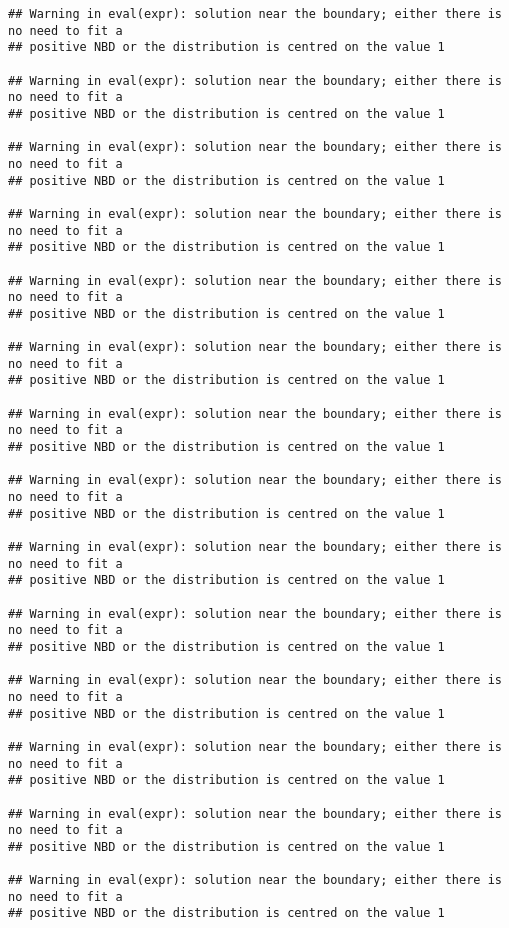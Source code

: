 \documentclass[
]{book}
\begin{document}
\begin{verbatim}
## Warning in eval(expr): solution near the boundary; either there is no need to fit a
## positive NBD or the distribution is centred on the value 1

## Warning in eval(expr): solution near the boundary; either there is no need to fit a
## positive NBD or the distribution is centred on the value 1

## Warning in eval(expr): solution near the boundary; either there is no need to fit a
## positive NBD or the distribution is centred on the value 1

## Warning in eval(expr): solution near the boundary; either there is no need to fit a
## positive NBD or the distribution is centred on the value 1

## Warning in eval(expr): solution near the boundary; either there is no need to fit a
## positive NBD or the distribution is centred on the value 1

## Warning in eval(expr): solution near the boundary; either there is no need to fit a
## positive NBD or the distribution is centred on the value 1

## Warning in eval(expr): solution near the boundary; either there is no need to fit a
## positive NBD or the distribution is centred on the value 1

## Warning in eval(expr): solution near the boundary; either there is no need to fit a
## positive NBD or the distribution is centred on the value 1

## Warning in eval(expr): solution near the boundary; either there is no need to fit a
## positive NBD or the distribution is centred on the value 1

## Warning in eval(expr): solution near the boundary; either there is no need to fit a
## positive NBD or the distribution is centred on the value 1

## Warning in eval(expr): solution near the boundary; either there is no need to fit a
## positive NBD or the distribution is centred on the value 1

## Warning in eval(expr): solution near the boundary; either there is no need to fit a
## positive NBD or the distribution is centred on the value 1

## Warning in eval(expr): solution near the boundary; either there is no need to fit a
## positive NBD or the distribution is centred on the value 1

## Warning in eval(expr): solution near the boundary; either there is no need to fit a
## positive NBD or the distribution is centred on the value 1


\end{verbatim}
\end{document}
